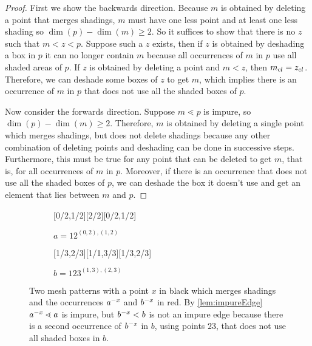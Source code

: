 \documentclass[11pt,a4paper,oneside]{article}
\begin{document}
\begin{proof}
First we show the backwards direction. Because $m$ is obtained by deleting a
point that merges shadings, $m$ must have one less point and at least one less
shading so $\dim(p)-\dim(m)\ge2$. So it suffices to show that there is no $z$ such
that $m<z<p$. Suppose such a $z$ exists, then if $z$ is obtained by deshading a
box in $p$ it can no longer contain $m$ because all occurrences of $m$ in $p$
use all shaded areas of $p$. If $z$ is obtained by deleting a point and $m<z$,
then $m_{cl}=z_{cl}$. Therefore, we can deshade some boxes
of $z$ to get $m$, which implies there is an occurrence of $m$ in $p$ that
does not use all the shaded boxes of $p$.

Now consider the forwards direction. Suppose $m\lessdot p$ is impure, so
$\dim(p)-\dim(m)\ge2$. Therefore, $m$ is obtained by deleting a single point
which merges shadings, but does not delete shadings because any other
combination of deleting points and deshading can be done in successive steps.
Furthermore, this must be true for any point that can be deleted to get $m$,
that is, for all occurrences of $m$ in $p$. Moreover, if there is an occurrence
that does not use all the shaded boxes of $p$, we can deshade the box it doesn't
use and get an element that lies between $m$ and $p$.
\end{proof}

\begin{figure}\centering
\begin{subfigure}[b]{0.3\textwidth}
\centering{}[0/2,1/2][2/2][0/2,1/2]
\caption*{$a=12^{(0,2),(1,2)}$}\label{subfig:a}\end{subfigure}
\begin{subfigure}[b]{0.3\textwidth}
\centering{}[1/3,2/3][1/1,3/3][1/3,2/3]
\caption*{$b=123^{(1,3),(2,3)}$}\label{subfig:b}\end{subfigure}
\caption{Two mesh patterns with a point $x$ in black which merges shadings and the occurrences
$a^{-x}$ and $b^{-x}$ in red. By \cref{lem:impureEdge} $a^{-x}\lessdot a$ is impure,
but $b^{-x}<b$ is not an impure edge because there is a second occurrence of $b^{-x}$ in $b$, using points $23$,
that does not use all shaded boxes in $b$.}\label{fig:impEx}
\end{figure}
\end{document}
